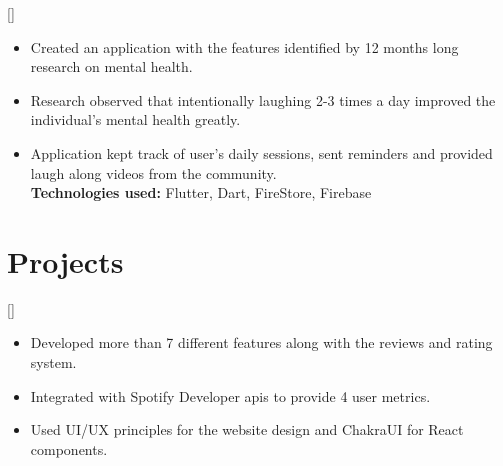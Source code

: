 \documentclass{article}
\begin{document}
[]
\begin{itemize}
    \item Created an application with the features identified by 12 months long research on mental health.
    \item Research observed that intentionally laughing 2-3 times a day improved the individual's mental health greatly.
    \item Application kept track of user's daily sessions, sent reminders and provided laugh along videos from the community.\\
\textbf{Technologies used:} Flutter, Dart, FireStore, Firebase
\end{itemize}





 
\section{Projects}


[] 
\item
\begin{itemize}
\item Developed more than 7 different features along with the reviews and rating system.
\item Integrated with Spotify Developer apis to provide 4 user metrics.
\item Used UI/UX principles for the website design and ChakraUI for React components.

\end{itemize}
\end{document}
